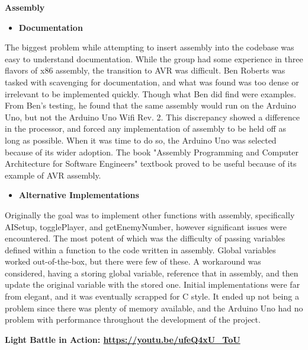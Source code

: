 \documentclass[twoside]{article}
\begin{document}
\hfill \break
\noindent\textbf{\Large Assembly}
\begin{itemize}
    \item\textbf{Documentation}
\end{itemize}
\text The biggest problem while attempting to insert assembly into the codebase was easy to understand documentation. While the group had some experience in three flavors of x86 assembly, the transition to AVR was difficult. Ben Roberts was tasked with scavenging for documentation, and what was found was too dense or irrelevant to be implemented quickly. Though what Ben did find were examples. From Ben's testing, he found that the same assembly would run on the Arduino Uno, but not the Arduino Uno Wifi Rev. 2. This discrepancy showed a difference in the processor, and forced any implementation of assembly to be held off as long as possible. When it was time to do so, the Arduino Uno was selected because of its wider adoption. The book "Assembly Programming and Computer Architecture for Software Engineers" textbook proved to be useful because of its example of AVR assembly. 

\begin{itemize}
    \item\textbf{Alternative Implementations}
\end{itemize}
\text Originally the goal was to implement other functions with assembly, specifically AISetup, togglePlayer, and getEnemyNumber, however significant issues were encountered. The most potent of which was the difficulty of passing variables defined within a function to the code written in assembly. Global variables worked out-of-the-box, but there were few of these. A workaround was considered, having a storing global variable, reference that in assembly, and then update the original variable with the stored one. Initial implementations were far from elegant, and it was eventually scrapped for C style. It ended up not being a problem since there was plenty of memory available, and the Arduino Uno had no problem with performance throughout the development of the project.

\hfill \break
\noindent\textbf{\Large Light Battle in Action: \url{https://youtu.be/ufeQ4xU_ToU}}
\end{document}
